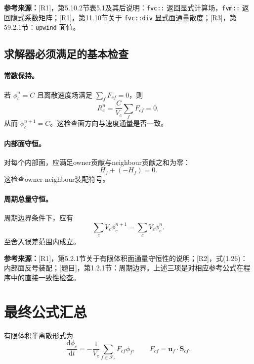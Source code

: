 \documentclass[UTF8,12pt,a4paper]{ctexart}
\numberwithin{equation}{section}
\newcommand{\Rone}{\textnormal{[R1]}}
\newcommand{\Rtwo}{\textnormal{[R2]}}
\newcommand{\Rthree}{\textnormal{[R3]}}
\newcommand{\Task}{\textnormal{[题目]}}
\newcommand{\source}[1]{%
  \par\smallskip
  \noindent\colorbox{sourcebg}{%
    \parbox{0.955\linewidth}{\footnotesize\color{sourcegray}\textbf{参考来源：}#1}%
  }
  \par\smallskip
}
\begin{document}
\source{\Rone，第5.10.2节表5.1及其后说明：\texttt{fvc::} 返回显式计算场，\texttt{fvm::} 返回隐式系数矩阵；\Rone，第11.10节关于 \texttt{fvc::div} 显式面通量散度；\Rthree，第59.2.1节：\texttt{upwind} 面值。}

\subsection{求解器必须满足的基本检查}

\paragraph{常数保持。}
若 $\phi_c^n=C$ 且离散速度场满足 $\sum_fF_{cf}=0$，则
\begin{equation}
  R_c^n=\frac{C}{V_c}\sum_fF_{cf}=0,
\end{equation}
从而 $\phi_c^{n+1}=C$。这检查面方向与速度通量是否一致。

\paragraph{内部面守恒。}
对每个内部面，应满足owner贡献与neighbour贡献之和为零：
\begin{equation}
  H_f+(-H_f)=0.
\end{equation}
这检查owner-neighbour装配符号。

\paragraph{周期总量守恒。}
周期边界条件下，应有
\begin{equation}
  \sum_cV_c\phi_c^{n+1}
  =\sum_cV_c\phi_c^n.
\end{equation}
至舍入误差范围内成立。

\source{\Rone，第5.2.1节关于有限体积面通量守恒性的说明；\Rtwo，式(1.26)：内部面反号装配；\Task，第1.2.1节：周期边界。上述三项是对相应参考公式在程序中的直接一致性检查。}

\section*{最终公式汇总}

有限体积半离散形式为
\begin{equation}
  \boxed{
  \frac{\mathrm d\phi_c}{\mathrm dt}
  =-\frac{1}{V_c}\sum_{f\in\mathcal F_c}F_{cf}\phi_f,
  \qquad
  F_{cf}=\bm u_f\cdot\bm S_{cf}
  }.
\end{equation}
\end{document}
